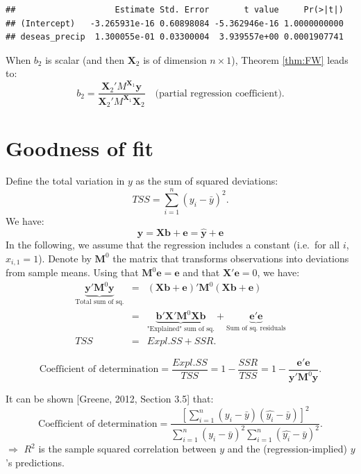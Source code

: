 \documentclass[
]{book}
\theoremstyle{definition}
\theoremstyle{definition}
\theoremstyle{definition}
\theoremstyle{definition}
\theoremstyle{remark}
\begin{document}
\begin{verbatim}
##                    Estimate Std. Error       t value     Pr(>|t|)
## (Intercept)   -3.265931e-16 0.60898084 -5.362946e-16 1.0000000000
## deseas_precip  1.300055e-01 0.03300004  3.939557e+00 0.0001907741
\end{verbatim}

When \(b_2\) is scalar (and then \(\mathbf{X}_2\) is of dimension \(n \times 1\)), Theorem \ref{thm:FW} leads to:
\[
b_2 = \frac{\mathbf{X}_2'M^{\mathbf{X}_1}\mathbf{y}}{\mathbf{X}_2'M^{\mathbf{X}_1}\mathbf{X}_2} \quad \text{(partial regression coefficient)}.
\]

\hypertarget{goodness-of-fit}{%
\section{Goodness of fit}\label{goodness-of-fit}}

Define the total variation in \(y\) as the sum of squared deviations:
\[
TSS = \sum_{i=1}^{n} (y_i - \bar{y})^2.
\]
We have:
\[
\mathbf{y} = \mathbf{X}\mathbf{b} + \mathbf{e} = \hat{\mathbf{y}} + \mathbf{e}
\]
In the following, we assume that the regression includes a constant (i.e.~for all \(i\), \(x_{i,1}=1\)). Denote by \(\mathbf{M}^0\) the matrix that transforms observations into deviations from sample means. Using that \(\mathbf{M}^0 \mathbf{e} = \mathbf{e}\) and that \(\mathbf{X}' \mathbf{e}=0\), we have:
\begin{eqnarray*}
\underbrace{\mathbf{y}'\mathbf{M}^0\mathbf{y}}_{\mbox{Total sum of sq.}} &=& (\mathbf{X}\mathbf{b} + \mathbf{e})' \mathbf{M}^0 (\mathbf{X}\mathbf{b} + \mathbf{e})\\
&=& \underbrace{\mathbf{b}' \mathbf{X}' \mathbf{M}^0 \mathbf{X}\mathbf{b}}_{\mbox{"Explained" sum of sq.}} + \underbrace{\mathbf{e}'\mathbf{e}}_{\mbox{Sum of sq. residuals}}\\
TSS &=& Expl.SS + SSR.
\end{eqnarray*}

\begin{equation}
\boxed{\mbox{Coefficient of determination} = \frac{Expl.SS}{TSS} = 1 - \frac{SSR}{TSS} = 1 - \frac{\mathbf{e}'\mathbf{e}}{\mathbf{y}'\mathbf{M}^0\mathbf{y}}.}\label{eq:RR2}
\end{equation}

It can be shown {[}Greene, 2012, Section 3.5{]} that:
\[
\mbox{Coefficient of determination} = \frac{[\sum_{i=1}^n(y_i - \bar{y})(\hat{y_i} - \bar{y})]^2}{\sum_{i=1}^n(y_i - \bar{y})^2 \sum_{i=1}^n(\hat{y_i} - \bar{y})^2}.
\]
\(\Rightarrow\) \(R^2\) is the sample squared correlation between \(y\) and the (regression-implied) \(y\)'s predictions.
\end{document}
